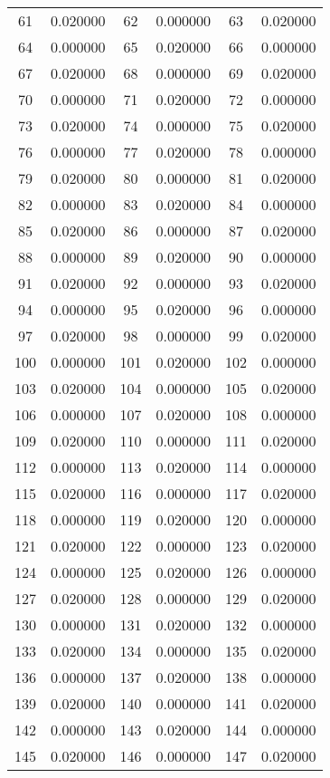 \documentclass[12pt]{article}
\begin{document}
\begin{longtable}{@{}cc|cc|cc@{}}
61 & 0.020000 & 62 & 0.000000 & 63 & 0.020000 \\
64 & 0.000000 & 65 & 0.020000 & 66 & 0.000000 \\
67 & 0.020000 & 68 & 0.000000 & 69 & 0.020000 \\
70 & 0.000000 & 71 & 0.020000 & 72 & 0.000000 \\
73 & 0.020000 & 74 & 0.000000 & 75 & 0.020000 \\
76 & 0.000000 & 77 & 0.020000 & 78 & 0.000000 \\
79 & 0.020000 & 80 & 0.000000 & 81 & 0.020000 \\
82 & 0.000000 & 83 & 0.020000 & 84 & 0.000000 \\
85 & 0.020000 & 86 & 0.000000 & 87 & 0.020000 \\
88 & 0.000000 & 89 & 0.020000 & 90 & 0.000000 \\
91 & 0.020000 & 92 & 0.000000 & 93 & 0.020000 \\
94 & 0.000000 & 95 & 0.020000 & 96 & 0.000000 \\
97 & 0.020000 & 98 & 0.000000 & 99 & 0.020000 \\
100 & 0.000000 & 101 & 0.020000 & 102 & 0.000000 \\
103 & 0.020000 & 104 & 0.000000 & 105 & 0.020000 \\
106 & 0.000000 & 107 & 0.020000 & 108 & 0.000000 \\
109 & 0.020000 & 110 & 0.000000 & 111 & 0.020000 \\
112 & 0.000000 & 113 & 0.020000 & 114 & 0.000000 \\
115 & 0.020000 & 116 & 0.000000 & 117 & 0.020000 \\
118 & 0.000000 & 119 & 0.020000 & 120 & 0.000000 \\
121 & 0.020000 & 122 & 0.000000 & 123 & 0.020000 \\
124 & 0.000000 & 125 & 0.020000 & 126 & 0.000000 \\
127 & 0.020000 & 128 & 0.000000 & 129 & 0.020000 \\
130 & 0.000000 & 131 & 0.020000 & 132 & 0.000000 \\
133 & 0.020000 & 134 & 0.000000 & 135 & 0.020000 \\
136 & 0.000000 & 137 & 0.020000 & 138 & 0.000000 \\
139 & 0.020000 & 140 & 0.000000 & 141 & 0.020000 \\
142 & 0.000000 & 143 & 0.020000 & 144 & 0.000000 \\
145 & 0.020000 & 146 & 0.000000 & 147 & 0.020000 \\

\end{longtable}
\end{document}
